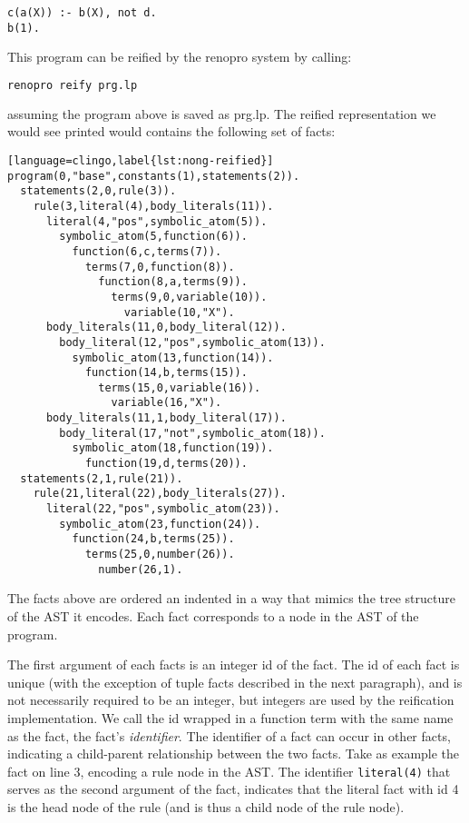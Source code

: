 \begin{lstlisting}[language=clingo]
c(a(X)) :- b(X), not d. 
b(1).
\end{lstlisting}

This program can be reified by the renopro system by calling:

\begin{lstlisting}[language=bash,numbers=none]
renopro reify prg.lp
\end{lstlisting}

assuming the program above is saved as prg.lp. The reified
representation we would see printed would contains the following set
of facts:

\begin{lstlisting}[language=clingo,label{lst:nong-reified}]
program(0,"base",constants(1),statements(2)).
  statements(2,0,rule(3)).
    rule(3,literal(4),body_literals(11)).
      literal(4,"pos",symbolic_atom(5)).
        symbolic_atom(5,function(6)).
          function(6,c,terms(7)).
            terms(7,0,function(8)).
              function(8,a,terms(9)).
                terms(9,0,variable(10)).
                  variable(10,"X").
      body_literals(11,0,body_literal(12)).
        body_literal(12,"pos",symbolic_atom(13)).
          symbolic_atom(13,function(14)).
            function(14,b,terms(15)).
              terms(15,0,variable(16)).
                variable(16,"X").
      body_literals(11,1,body_literal(17)).
        body_literal(17,"not",symbolic_atom(18)).
          symbolic_atom(18,function(19)).
            function(19,d,terms(20)).
  statements(2,1,rule(21)).
    rule(21,literal(22),body_literals(27)).
      literal(22,"pos",symbolic_atom(23)).
        symbolic_atom(23,function(24)).
          function(24,b,terms(25)).
            terms(25,0,number(26)).
              number(26,1).
\end{lstlisting}

The facts above are ordered an indented in a way that mimics the tree
structure of the AST it encodes. Each fact corresponds to a node in
the AST of the program. 

The first argument of each facts is an integer id of the fact. The id
of each fact is unique (with the exception of tuple facts described in
the next paragraph), and is not necessarily required to be an integer,
but integers are used by the reification implementation. We call the
id wrapped in a function term with the same name as the fact, the
fact's \emph{identifier}. The identifier of a fact can occur in other
facts, indicating a child-parent relationship between the two facts.
Take as example the fact on line 3, encoding a rule node in the
AST. The identifier \texttt{literal(4)} that serves as the second
argument of the fact, indicates that the literal fact with id 4 is the
head node of the rule (and is thus a child node of the rule node).

